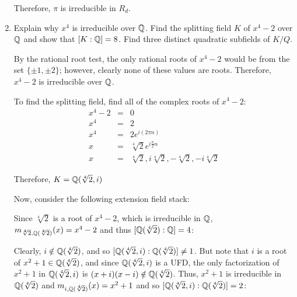 \documentclass[letterpaper,12pt,fleqn]{article}
\begin{document}
\begin{enumerate}
  Therefore, $\pi$ is irreducible in $R_d$.

  \bigskip
  
\item Explain why $x^4$ is irreducible over $\mathbb{Q}$. Find the splitting field
  $K$ of $x^4-2$ over $\mathbb{Q}$ and show that $[K:\mathbb{Q}]=8$. Find three distinct
  quadratic subfields of $K/Q$.

  \bigskip

  By the rational root test, the only rational roots of $x^4-2$ would be from
  the set $\{\pm1,\pm2\}$; however, clearly none of these values are roots.
  Therefore, $x^4-2$ is irreducible over $\mathbb{Q}$.

  \newcommand{\ft}{\sqrt[4]{2}}

  To find the splitting field, find all of the complex roots of $x^4-2$:
  \begin{eqnarray*}
    x^4-2 &=& 0 \\
    x^4 &=& 2 \\
    x^4 &=& 2e^{i(2\pi n)} \\
    x &=& \ft e^{i\frac{\pi}{2}n} \\
    x &=& \ft,i\ft,-\ft,-i\ft
  \end{eqnarray*}

  \newcommand{\kf}{\Q(\ft,i)}

  Therefore, $K=\kf$

  Now, consider the following extension field stack:

  \newcommand{\lf}{\Q(\ft)}


  Since $\ft$ is a root of $x^4-2$, which is irreducible in $\mathbb{Q}$,
  $m_{\ft,\lf}(x)=x^4-2$ and thus $[\lf:\Q]=4$:


  Clearly, $i\notin\lf$, and so $[\kf:\lf]\ne1$. But note that $i$ is a root of
  $x^2+1\in\lf$, and since $\kf$ is a UFD, the only factorization of $x^2+1$ in
  $\kf$ is $(x+i)(x-i)\notin\lf$. Thus, $x^2+1$ is irreducible in $\lf$ and
  $m_{i,\lf}(x)=x^2+1$ and so $[\kf:\lf]=2$:


\end{enumerate}
\end{document}
